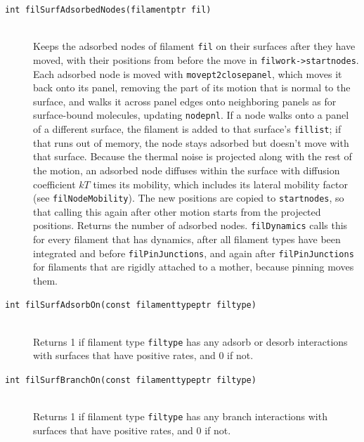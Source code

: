 \documentclass {scrbook}
\newcommand {\ttt} {\texttt}
\begin{document}
\begin{description}
\item[\ttt{int filSurfAdsorbedNodes(filamentptr fil)}] %
\hfill \\
Keeps the adsorbed nodes of filament \ttt{fil} on their surfaces after they have moved, with their positions from before the move in \ttt{filwork->startnodes}. Each adsorbed node is moved with \ttt{movept2closepanel}, which moves it back onto its panel, removing the part of its motion that is normal to the surface, and walks it across panel edges onto neighboring panels as for surface-bound molecules, updating \ttt{nodepnl}. If a node walks onto a panel of a different surface, the filament is added to that surface's \ttt{fillist}; if that runs out of memory, the node stays adsorbed but doesn't move with that surface. Because the thermal noise is projected along with the rest of the motion, an adsorbed node diffuses within the surface with diffusion coefficient $kT$ times its mobility, which includes its lateral mobility factor (see \ttt{filNodeMobility}). The new positions are copied to \ttt{startnodes}, so that calling this again after other motion starts from the projected positions. Returns the number of adsorbed nodes. \ttt{filDynamics} calls this for every filament that has dynamics, after all filament types have been integrated and before \ttt{filPinJunctions}, and again after \ttt{filPinJunctions} for filaments that are rigidly attached to a mother, because pinning moves them.

\item[\ttt{int filSurfAdsorbOn(const filamenttypeptr filtype)}] %
\hfill \\
Returns 1 if filament type \ttt{filtype} has any adsorb or desorb interactions with surfaces that have positive rates, and 0 if not.

\item[\ttt{int filSurfBranchOn(const filamenttypeptr filtype)}] %
\hfill \\
Returns 1 if filament type \ttt{filtype} has any branch interactions with surfaces that have positive rates, and 0 if not.


\end{description}
\end{document}
